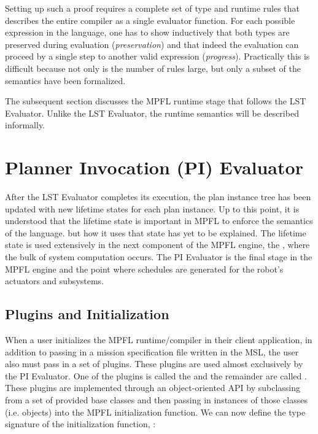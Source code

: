Setting up such a proof requires a complete set of type and runtime rules that describes the entire compiler as a single evaluator function. For each possible expression in the language, one has to show inductively that both types are preserved during evaluation (\textit{preservation}) and that indeed the evaluation can proceed by a single step to another valid expression (\textit{progress}). Practically this is difficult because not only is the number of rules large, but only a subset of the semantics have been formalized. 

The subsequent section discusses the MPFL runtime stage that follows the LST Evaluator. Unlike the LST Evaluator, the runtime semantics will be described informally.

\section{Planner Invocation (PI) Evaluator}
After the LST Evaluator completes its execution, the plan instance tree has been updated with new lifetime states for each plan instance. Up to this point, it is understood that the lifetime state is important in MPFL to enforce the semantics of the language. but how it uses that state has yet to be explained. The lifetime state is used extensively in the next component of the MPFL engine, the , where the bulk of system computation occurs. The PI Evaluator is the final stage in the MPFL engine and the point where schedules are generated for the robot's actuators and subsystems. 

\subsection{Plugins and Initialization}
When a user initializes the MPFL runtime/compiler in their client application, in addition to passing in a mission specification file written in the MSL, the user also must pass in a set of plugins. These plugins are used almost exclusively by the PI Evaluator. One of the plugins is called the  and the remainder are called . These plugins are implemented through an object-oriented API by subclassing from a set of provided base classes and then passing in instances of those classes (i.e. objects) into the MPFL initialization function. We can now define the type signature of the initialization function, :

